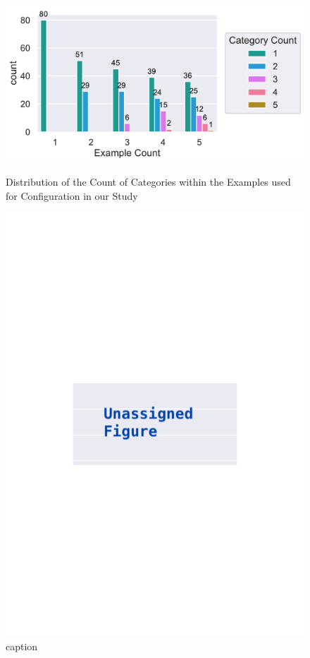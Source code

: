\documentclass[\myrootdir/main.tex]{subfiles}
\begin{document}
\begin{figure}[htbp]
	\centering
	\begin{minipage}{0.45\textwidth}
		\centering
		\includegraphics[width=\textwidth, clip]{img/big-study/categorycount-examplecount-dataset.pdf}
		\caption{Distribution of the Count of Categories within the Examples used for Configuration in our Study}
		\label{fig:categorycount-examplecount-dataset}
	\end{minipage}\hfill
	\begin{minipage}{0.45\textwidth}
		\centering
		\includegraphics[width=\textwidth, clip]{img/big-study/xxx.pdf}
		\caption{caption}
		\label{fig:xxxy}
	\end{minipage}
\end{figure}
\end{document}
